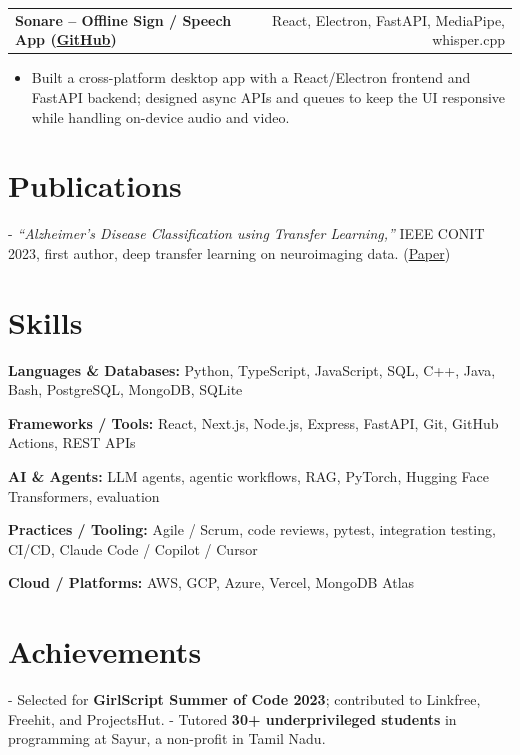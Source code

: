 \documentclass[letterpaper,11pt]{article}
\makeatletter
\newcommand{\projItem}[2]{%
  \vspace{6pt}
  \begin{tabular*}{\textwidth}{@{}l@{\extracolsep{\fill}}r@{}}
    \textbf{#1} & #2 \\
  \end{tabular*}\par\vspace{-2pt}
}
\newcommand{\skillLine}[2]{\textbf{#1:} #2\par\vspace{2pt}}
\newcommand{\inlineBlock}[1]{{\setlength{\leftskip}{0.18in}\small #1\par}}
\makeatother
\begin{document}
\projItem{Sonare -- Offline Sign / Speech App {\normalfont\small(\href{https://github.com/Deva-1903/Qualcomm-Sep25-Team-Sonare}{GitHub})}}{React, Electron, FastAPI, MediaPipe, whisper.cpp}
\begin{itemize}
  \item Built a cross-platform desktop app with a React/Electron frontend and FastAPI backend; designed async APIs and queues to keep the UI responsive while handling on-device audio and video.
\end{itemize}

\section{Publications}
\inlineBlock{- \textit{``Alzheimer's Disease Classification using Transfer Learning,''} IEEE CONIT 2023, first author, deep transfer learning on neuroimaging data. {\normalfont\small(\href{https://ieeexplore.ieee.org/document/10205760}{Paper})}}

\section{Skills}
\skillLine{Languages \& Databases}{Python, TypeScript, JavaScript, SQL, C++, Java, Bash, PostgreSQL, MongoDB, SQLite}
\skillLine{Frameworks / Tools}{React, Next.js, Node.js, Express, FastAPI, Git, GitHub Actions, REST APIs}
\skillLine{AI \& Agents}{LLM agents, agentic workflows, RAG, PyTorch, Hugging Face Transformers, evaluation}
\skillLine{Practices / Tooling}{Agile / Scrum, code reviews, pytest, integration testing, CI/CD, Claude Code / Copilot / Cursor}
\skillLine{Cloud / Platforms}{AWS, GCP, Azure, Vercel, MongoDB Atlas}

\section{Achievements}
\inlineBlock{- Selected for \textbf{GirlScript Summer of Code 2023}; contributed to Linkfree, Freehit, and ProjectsHut. - Tutored \textbf{30+ underprivileged students} in programming at Sayur, a non-profit in Tamil Nadu.}
\end{document}
